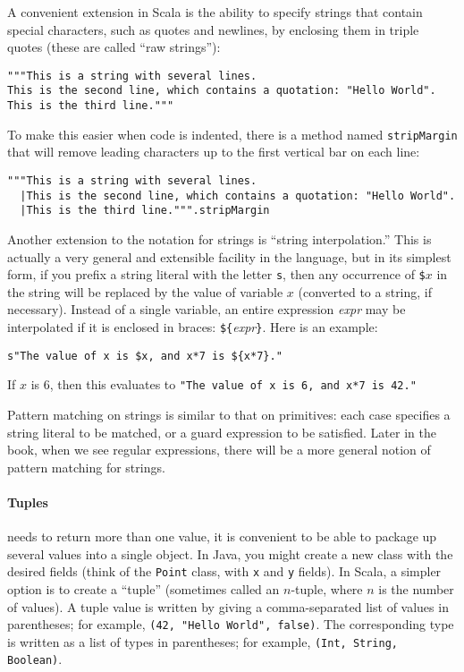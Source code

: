 A convenient extension in Scala is the ability to specify strings that contain special characters, such as quotes and newlines, by enclosing them in triple quotes (these are called ``raw strings''):
\begin{verbatim}
"""This is a string with several lines.
This is the second line, which contains a quotation: "Hello World".
This is the third line."""
\end{verbatim}
To make this easier when code is indented, there is a method named \verb|stripMargin| that will remove leading characters up to the first vertical bar on each line:
\begin{verbatim}
"""This is a string with several lines.
  |This is the second line, which contains a quotation: "Hello World".
  |This is the third line.""".stripMargin
\end{verbatim}

Another extension to the notation for strings is ``string interpolation.'' This is actually a very general and extensible facility in the language, but in its simplest form, if you prefix a string literal with the letter \verb|s|, then any occurrence of \verb|$|$x$ in the string will be replaced by the value of variable $x$ (converted to a string, if necessary). Instead of a single variable, an entire expression \textit{expr} may be interpolated if it is enclosed in braces: \verb|${|\textit{expr}\verb|}|. Here is an example:
\begin{verbatim}
s"The value of x is $x, and x*7 is ${x*7}."
\end{verbatim}
If $x$ is 6, then this evaluates to \verb|"The value of x is 6, and x*7 is 42."|

Pattern matching on strings is similar to that on primitives: each case specifies a string literal to be matched, or a guard expression to be satisfied. Later in the book, when we see regular expressions, there will be a more general notion of pattern matching for strings.

\paragraph{Tuples}
 needs to return more than one value, it is convenient to be able to package up several values into a single object. In Java, you might create a new class with the desired fields (think of the \verb|Point| class, with \verb|x| and \verb|y| fields). In Scala, a simpler option is to create a ``tuple'' (sometimes called an $n$-tuple, where $n$ is the number of values). A tuple value is written by giving a comma-separated list of values in parentheses; for example, \verb|(42, "Hello World", false)|. The corresponding type is written as a list of types in parentheses; for example, \verb|(Int, String, Boolean)|.

